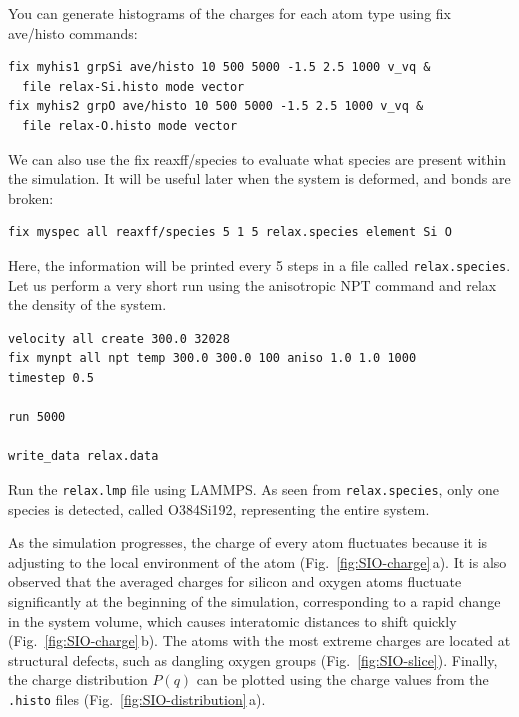 \documentclass[9pt,tutorial]{livecoms}
\newcommand{\lmpcmd}[1]{\hspace{0pt}\colorbox{listing}{\textcolor{command}{\small{#1}}}\hspace{0pt}} %
\newcommand{\flecmd}[1]{\textcolor{command}{\texttt{#1}}} %
\begin{document}
You can generate histograms of the charges for each atom type using
\lmpcmd{fix ave/histo} commands:
\begin{lstlisting}
fix myhis1 grpSi ave/histo 10 500 5000 -1.5 2.5 1000 v_vq &
  file relax-Si.histo mode vector
fix myhis2 grpO ave/histo 10 500 5000 -1.5 2.5 1000 v_vq &
  file relax-O.histo mode vector
\end{lstlisting}
We can also use the \lmpcmd{fix reaxff/species} to evaluate what species are
present within the simulation.  It will be useful later when the system is deformed,
and bonds are broken:
\begin{lstlisting}
fix myspec all reaxff/species 5 1 5 relax.species element Si O
\end{lstlisting}
Here, the information will be printed every 5 steps in a file called \flecmd{relax.species}.
Let us perform a very short run using the anisotropic NPT command and relax the
density of the system.
\begin{lstlisting}
velocity all create 300.0 32028
fix mynpt all npt temp 300.0 300.0 100 aniso 1.0 1.0 1000
timestep 0.5

run 5000

write_data relax.data
\end{lstlisting}
Run the \flecmd{relax.lmp} file using LAMMPS.  As seen from \flecmd{relax.species},
only one species is detected, called \lmpcmd{O384Si192}, representing the entire system.

As the simulation progresses, the charge of every atom fluctuates
because it is adjusting to the local environment of the atom (Fig.~\ref{fig:SIO-charge}\,a).
It is also observed that the averaged charges for silicon and oxygen
atoms fluctuate significantly at the beginning of the simulation, corresponding
to a rapid change in the system volume, which causes interatomic distances to
shift quickly (Fig.~\ref{fig:SIO-charge}\,b).  The atoms with the
most extreme charges are located at structural defects,
such as dangling oxygen groups (Fig.~\ref{fig:SIO-slice}).
Finally, the charge distribution $P(q)$ can be plotted using the charge values
from the \flecmd{.histo} files (Fig.~\ref{fig:SIO-distribution}\,a).
\end{document}
